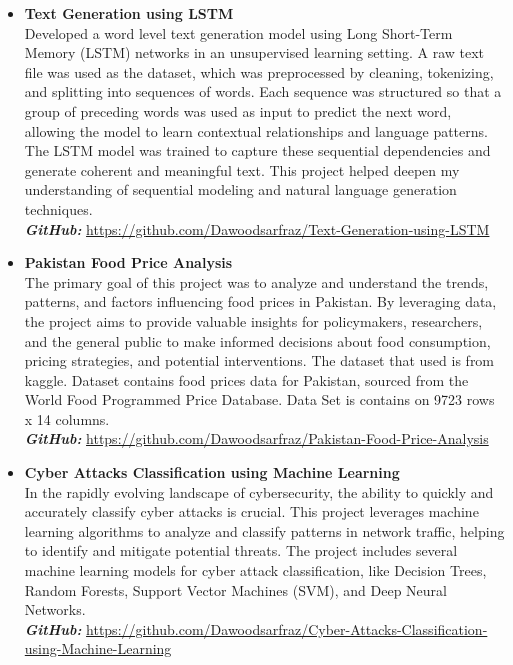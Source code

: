 \documentclass[a4paper,12pt]{article}
\begin{document}
\begin{itemize}
\item \textbf{Text Generation using LSTM} \\
Developed a word level text generation model using Long Short-Term Memory (LSTM) networks in an unsupervised learning setting. A raw text file was used as the dataset, which was preprocessed by cleaning, tokenizing, and splitting into sequences of words. Each sequence was structured so that a group of preceding words was used as input to predict the next word, allowing the model to learn contextual relationships and language patterns. The LSTM model was trained to capture these sequential dependencies and generate coherent and meaningful text. This project helped deepen my understanding of sequential modeling and natural language generation techniques.   \\
\textbf{\textit{GitHub:}} \href{https://github.com/Dawoodsarfraz/Text-Generation-using-LSTM}{https://github.com/Dawoodsarfraz/Text-Generation-using-LSTM}

\item \textbf{Pakistan Food Price Analysis} \\
The primary goal of this project was to analyze and understand the trends, patterns, and factors influencing food prices in Pakistan. By leveraging data, the project aims to provide valuable insights for policymakers, researchers, and the general public to make informed decisions about food consumption, pricing strategies, and potential interventions. The dataset that used is from kaggle. Dataset contains food prices data for Pakistan, sourced from the World Food Programmed Price Database. Data Set is contains on 9723 rows x 14 columns. \\
\textbf{\textit{GitHub:}} \href{https://github.com/Dawoodsarfraz/Pakistan-Food-Price-Analysis}{https://github.com/Dawoodsarfraz/Pakistan-Food-Price-Analysis}
	

\item \textbf{Cyber Attacks Classification using Machine Learning} \\
In the rapidly evolving landscape of cybersecurity, the ability to quickly and accurately classify cyber attacks is crucial. This project leverages machine learning algorithms to analyze and classify patterns in network traffic, helping to identify and mitigate potential threats. The project includes several machine learning models for cyber attack classification, like Decision Trees, Random Forests, Support Vector Machines (SVM), and Deep Neural Networks. \\
\textbf{\textit{GitHub:}} \url{https://github.com/Dawoodsarfraz/Cyber-Attacks-Classification-using-Machine-Learning}



\end{itemize}
\end{document}
